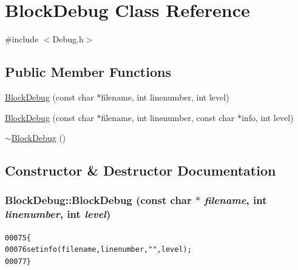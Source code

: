 \hypertarget{class_block_debug}{
\section{BlockDebug Class Reference}
\label{class_block_debug}
}


{\ttfamily \#include $<$Debug.h$>$}

\subsection*{Public Member Functions}
\begin{DoxyCompactItemize}
\item 
\hyperlink{class_block_debug_ad0b4c92c068d6a2c8c89df860df29b02}{BlockDebug} (const char $\ast$filename, int linenumber, int level)
\item 
\hyperlink{class_block_debug_ab104ecf455577f36f9f5ef176d53d8ae}{BlockDebug} (const char $\ast$filename, int linenumber, const char $\ast$info, int level)
\item 
\hyperlink{class_block_debug_a82a6d59776c3191a56b532ec23f6174e}{$\sim$BlockDebug} ()
\end{DoxyCompactItemize}


\subsection{Constructor \& Destructor Documentation}
\hypertarget{class_block_debug_ad0b4c92c068d6a2c8c89df860df29b02}{
\subsubsection[{BlockDebug}]{\setlength{\rightskip}{0pt plus 5cm}BlockDebug::BlockDebug (const char $\ast$ {\em filename}, \/  int {\em linenumber}, \/  int {\em level})}}
\label{class_block_debug_ad0b4c92c068d6a2c8c89df860df29b02}




\begin{footnotesize}\begin{alltt}
00075         \{
00076                 setinfo(filename, linenumber, \textcolor{stringliteral}{""}, level);
00077         \}
\end{alltt}\end{footnotesize}


